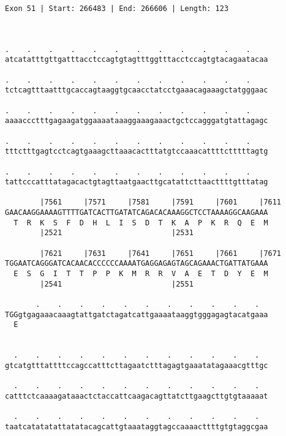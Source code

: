 \documentclass{article}
\begin{document}
\begin{Verbatim}
Exon 51 | Start: 266483 | End: 266606 | Length: 123



.    .    .    .    .    .    .    .    .    .    .    .    
atcatatttgttgatttacctccagtgtagtttggtttacctccagtgtacagaatacaa
                                                            
.    .    .    .    .    .    .    .    .    .    .    .    
tctcagtttaatttgcaccagtaaggtgcaacctatcctgaaacagaaagctatgggaac
                                                            
.    .    .    .    .    .    .    .    .    .    .    .    
aaaaccctttgagaagatggaaaataaaggaaagaaactgctccagggatgtattagagc
                                                            
.    .    .    .    .    .    .    .    .    .    .    .    
tttctttgagtcctcagtgaaagcttaaacactttatgtccaaacattttctttttagtg
                                                            
.    .    .    .    .    .    .    .    .    .    .    .    
tattcccatttatagacactgtagttaatgaacttgcatattcttaacttttgtttatag
                                                            
        |7561     |7571     |7581     |7591     |7601     |7611
GAACAAGGAAAAGTTTTGATCACTTGATATCAGACACAAAGGCTCCTAAAAGGCAAGAAA
  T  R  K  S  F  D  H  L  I  S  D  T  K  A  P  K  R  Q  E  M
        |2521                         |2531                 
  
        |7621     |7631     |7641     |7651     |7661     |7671
TGGAATCAGGGATCACAACACCCCCCAAAATGAGGAGAGTAGCAGAAACTGATTATGAAA
  E  S  G  I  T  T  P  P  K  M  R  R  V  A  E  T  D  Y  E  M
        |2541                         |2551                 
  
       .    .    .    .    .    .    .    .    .    .    .  
TGGgtgagaaacaaagtattgatctagatcattgaaaataaggtgggagagtacatgaaa
  E                                                         
                                                            
  
  .    .    .    .    .    .    .    .    .    .    .    .  
gtcatgtttattttccagccatttcttagaatctttagagtgaaatatagaaacgtttgc
                                                            
  .    .    .    .    .    .    .    .    .    .    .    .  
catttctcaaaagataaactctaccattcaagacagttatcttgaagcttgtgtaaaaat
                                                            
  .    .    .    .    .    .    .    .    .    .    .    .  
taatcatatatattatatacagcattgtaaataggtagccaaaacttttgtgtaggcgaa
                                                            

\end{Verbatim}
\end{document}
